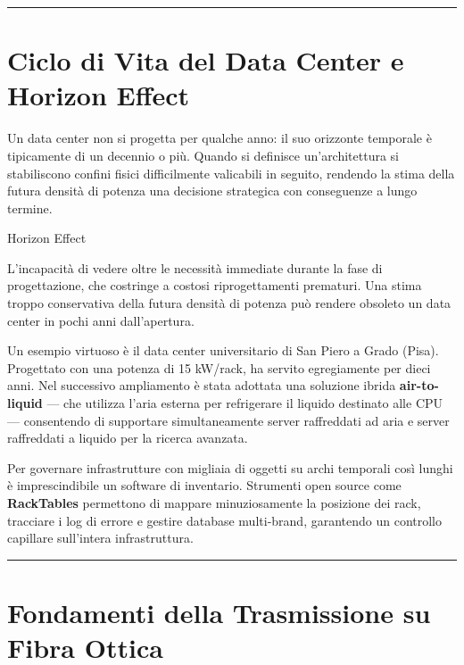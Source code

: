 \documentclass[
  italian,
  openany]{book}
\begin{document}
\begin{center}\rule{0.5\linewidth}{0.5pt}\end{center}

\section{Ciclo di Vita del Data Center e Horizon
Effect}\label{ciclo-di-vita-del-data-center-e-horizon-effect}

Un data center non si progetta per qualche anno: il suo orizzonte
temporale è tipicamente di un decennio o più. Quando si definisce
un'architettura si stabiliscono confini fisici difficilmente valicabili
in seguito, rendendo la stima della futura densità di potenza una
decisione strategica con conseguenze a lungo termine.

\begin{calloutdefinition}{Horizon Effect}

L'incapacità di vedere oltre le necessità immediate durante la fase di
progettazione, che costringe a costosi riprogettamenti prematuri. Una
stima troppo conservativa della futura densità di potenza può rendere
obsoleto un data center in pochi anni dall'apertura.

\end{calloutdefinition}

Un esempio virtuoso è il data center universitario di San Piero a Grado
(Pisa). Progettato con una potenza di 15 kW/rack, ha servito
egregiamente per dieci anni. Nel successivo ampliamento è stata adottata
una soluzione ibrida \textbf{air-to-liquid} --- che utilizza l'aria
esterna per refrigerare il liquido destinato alle CPU --- consentendo di
supportare simultaneamente server raffreddati ad aria e server
raffreddati a liquido per la ricerca avanzata.

Per governare infrastrutture con migliaia di oggetti su archi temporali
così lunghi è imprescindibile un software di inventario. Strumenti open
source come \textbf{RackTables} permettono di mappare minuziosamente la
posizione dei rack, tracciare i log di errore e gestire database
multi-brand, garantendo un controllo capillare sull'intera
infrastruttura.

\begin{center}\rule{0.5\linewidth}{0.5pt}\end{center}

\section{Fondamenti della Trasmissione su Fibra
Ottica}\label{fondamenti-della-trasmissione-su-fibra-ottica}
\end{document}
